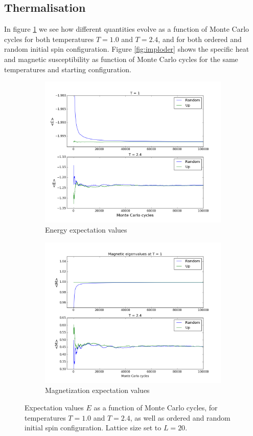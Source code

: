 \documentclass{article}
\begin{document}
\subsection{Thermalisation}
In figure \ref{fig:impala} we see how different quantities evolve as a function of Monte Carlo cycles for both temperatures $T=1.0$ and $T=2.4$, and for both ordered and random initial spin configuration. Figure \ref{fig:imploder} shows the specific heat and magnetic susceptibility as function of Monte Carlo cycles for the same temperatures and starting configuration.
\begin{figure}[H]
  \centering
  \begin{subfigure}{0.49\textwidth}
    \includegraphics[scale=0.29]{../figures/task_c/energyeig.png}
    \caption{Energy expectation values}
  \end{subfigure}
  \begin{subfigure}{0.49\textwidth}
    \includegraphics[scale=0.29]{../figures/task_c/Mageig.png}
    \caption{Magnetization expectation values}
  \end{subfigure}
  \caption{Expectation values $E$ as a function of Monte Carlo cycles, for temperatures $T=1.0$ and $T=2.4$, as well as ordered and random initial spin configuration. Lattice size set to $L=20$.}
  \label{fig:impala}
\end{figure}
\end{document}
